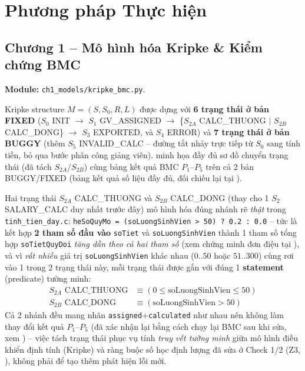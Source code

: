 \section{Phương pháp Thực hiện}
\label{sec:phuongphap}

\subsection{Chương 1 -- Mô hình hóa Kripke \& Kiểm chứng BMC}
\label{sec:ch1}

\textbf{Module:} \texttt{ch1\_models/kripke\_bmc.py}.

Kripke structure $M = (S, S_0, R, L)$ được dựng với \textbf{6 trạng thái ở bản FIXED} ($S_0$ INIT $\to$ $S_1$ GV\_ASSIGNED $\to$ \{$S_{2A}$ CALC\_THUONG $\mid$ $S_{2B}$ CALC\_DONG\} $\to$ $S_3$ EXPORTED, và $S_4$ ERROR) và \textbf{7 trạng thái ở bản BUGGY} (thêm $S_5$ INVALID\_CALC -- đường tắt nhảy trực tiếp từ $S_0$ sang tính tiền, bỏ qua bước phân công giảng viên).  minh họa đầy đủ sơ đồ chuyển trạng thái (đã tách $S_{2A}$/$S_{2B}$) cùng bảng kết quả BMC $P_1$--$P_5$ trên cả 2 bản BUGGY/FIXED (bảng kết quả số liệu đầy đủ, đối chiếu lại tại ).

Hai trạng thái $S_{2A}$ CALC\_THUONG và $S_{2B}$ CALC\_DONG (thay cho 1 $S_2$ SALARY\_CALC duy nhất trước đây) mô hình hóa đúng nhánh rẽ \emph{thật} trong \texttt{tinh\_tien\_day.c}: \texttt{heSoQuyMo = (soLuongSinhVien > 50) ? 0.2 : 0.0} -- tức là kết hợp \textbf{2 tham số đầu vào} \texttt{soTiet} và \texttt{soLuongSinhVien} thành 1 tham số tổng hợp \texttt{soTietQuyDoi} \emph{tăng dần theo cả hai tham số} (xem chứng minh đơn điệu tại ), và vì \emph{rất nhiều} giá trị \texttt{soLuongSinhVien} khác nhau ($0..50$ hoặc $51..300$) cùng rơi vào 1 trong 2 trạng thái này, mỗi trạng thái được gắn với đúng 1 \textbf{statement} (predicate) tường minh:
\begin{align*}
  S_{2A}\text{ CALC\_THUONG} &\equiv (0 \le \text{soLuongSinhVien} \le 50) \\
  S_{2B}\text{ CALC\_DONG} &\equiv (\text{soLuongSinhVien} > 50)
\end{align*}
Cả 2 nhánh đều mang nhãn \texttt{assigned}+\texttt{calculated} như nhau nên không làm thay đổi kết quả $P_1$--$P_5$ (đã xác nhận lại bằng cách chạy lại BMC sau khi sửa, xem ) -- việc tách trạng thái phục vụ tính \emph{truy vết tường minh} giữa mô hình điều khiển định tính (Kripke) và ràng buộc số học định lượng đã sửa ở Check 1/2 (Z3, ), không phải để tạo thêm phát hiện lỗi mới.

